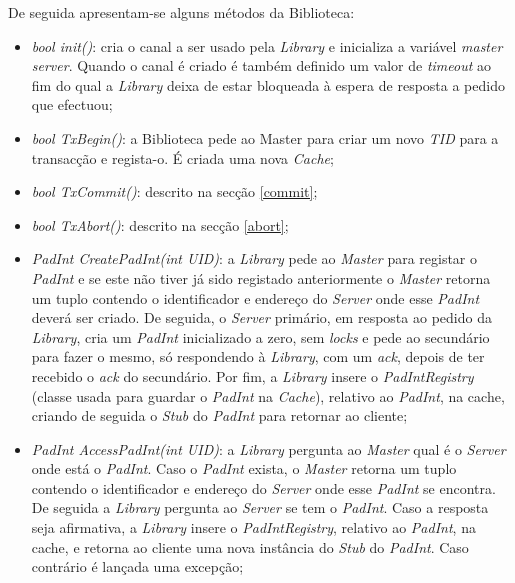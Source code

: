 De seguida apresentam-se alguns métodos da Biblioteca:
\begin{itemize}
\item \textit{bool init()}: cria o canal a ser usado pela \textit{Library} e inicializa a variável\textit{ master server}. Quando o canal é criado é também definido um valor de \textit{timeout} ao fim do qual a \textit{Library} deixa de estar bloqueada à espera de resposta a pedido que efectuou;

\item \textit{bool TxBegin()}: a Biblioteca pede ao Master para criar um novo \textit{TID} para a transacção e regista-o. É criada uma nova \textit{Cache};

\item \textit{bool TxCommit()}: descrito na secção \ref{commit};

\item \textit{bool TxAbort()}: descrito na secção \ref{abort};

\item \textit{PadInt CreatePadInt(int UID)}: a \textit{Library} pede ao \textit{Master} para registar o \textit{PadInt} e se este não tiver já sido registado anteriormente o \textit{Master} retorna um tuplo contendo o identificador e endereço do \textit{Server} onde esse \textit{PadInt} deverá ser criado. De seguida, o \textit{Server} primário, em resposta ao pedido da \textit{Library}, cria um \textit{PadInt} inicializado a zero, sem \textit{locks} e pede ao secundário para fazer o mesmo, só respondendo à \textit{Library}, com um \textit{ack}, depois de ter recebido o \textit{ack} do secundário. Por fim, a \textit{Library} insere o \textit{PadIntRegistry} (classe usada para guardar o \textit{PadInt} na \textit{Cache}), relativo ao \textit{PadInt}, na cache, criando de seguida o \textit{Stub} do \textit{PadInt} para retornar ao cliente;

\item \textit{PadInt AccessPadInt(int UID)}: a \textit{Library} pergunta ao \textit{Master} qual é o \textit{Server} onde está o \textit{PadInt}. Caso o \textit{PadInt} exista,  o \textit{Master} retorna um tuplo contendo o identificador e endereço do \textit{Server} onde esse \textit{PadInt} se encontra. De seguida a \textit{Library} pergunta ao \textit{Server} se tem o \textit{PadInt}. Caso a resposta seja afirmativa, a \textit{Library} insere o \textit{PadIntRegistry}, relativo ao \textit{PadInt}, na cache,  e retorna ao cliente uma nova instância do \textit{Stub} do \textit{PadInt}. Caso contrário é lançada uma excepção;
\end{itemize}

